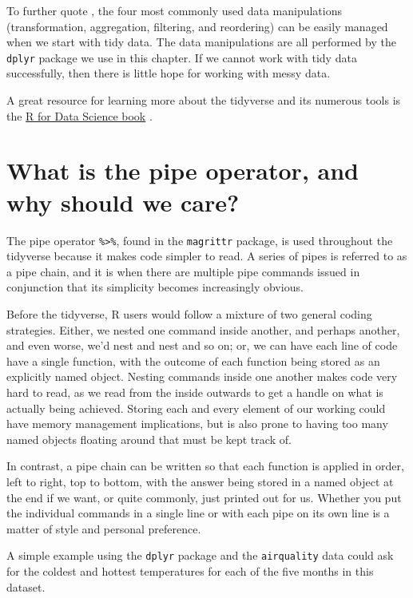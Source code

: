 \documentclass[
]{book}
\begin{document}
To further quote \citet{Wickham2014Tidy}, the four most commonly used data manipulations (transformation, aggregation, filtering, and reordering) can be easily managed when we start with tidy data. The data manipulations are all performed by the \texttt{dplyr} package we use in this chapter. If we cannot work with tidy data successfully, then there is little hope for working with messy data.

A great resource for learning more about the tidyverse and its numerous tools is the \href{http://r4ds.had.co.nz/}{R for Data Science book} \citep{GrolemundWickham2016}.

\hypertarget{what-is-the-pipe-operator-and-why-should-we-care}{%
\section{What is the pipe operator, and why should we care?}\label{what-is-the-pipe-operator-and-why-should-we-care}}

The pipe operator \texttt{\%\textgreater{}\%}, found in the \texttt{magrittr} package, is used throughout the tidyverse because it makes code simpler to read. A series of pipes is referred to as a pipe chain, and it is when there are multiple pipe commands issued in conjunction that its simplicity becomes increasingly obvious.

Before the tidyverse, R users would follow a mixture of two general coding strategies. Either, we nested one command inside another, and perhaps another, and even worse, we'd nest and nest and so on; or, we can have each line of code have a single function, with the outcome of each function being stored as an explicitly named object. Nesting commands inside one another makes code very hard to read, as we read from the inside outwards to get a handle on what is actually being achieved. Storing each and every element of our working could have memory management implications, but is also prone to having too many named objects floating around that must be kept track of.

In contrast, a pipe chain can be written so that each function is applied in order, left to right, top to bottom, with the answer being stored in a named object at the end if we want, or quite commonly, just printed out for us. Whether you put the individual commands in a single line or with each pipe on its own line is a matter of style and personal preference.

A simple example using the \texttt{dplyr} package and the \texttt{airquality} data could ask for the coldest and hottest temperatures for each of the five months in this dataset.
\end{document}
